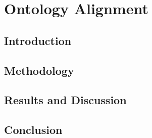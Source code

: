 \chapter{Ontology Alignment} 
\label{chap:b}

\section{Introduction}

\section{Methodology}

\section{Results and Discussion}

\section{Conclusion}